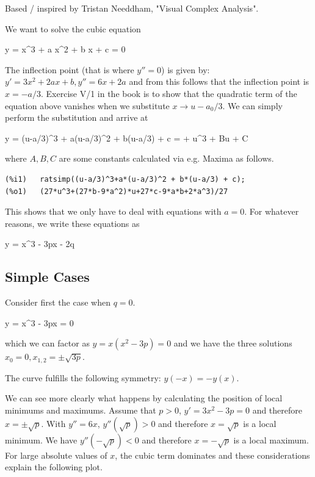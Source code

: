 

Based / inspired by Tristan Needdham, "Visual Complex Analysis".


We want to solve the cubic equation

\bee
y = x^3 + a x^2 + b x + c = 0
\eee

The inflection point (that is where $y'' = 0$) is given by: $y' = 3x^2 + 2ax + b, y'' = 6x + 2a$ and from this follows that the inflection point is $x = -a / 3$. Exercise V/1 in the book is to show that the quadratic term of the equation above vanishes when we substitute $x \rightarrow u - a_0/3$. We can simply perform the substitution and arrive at 

\bee
y = (u-a/3)^3 + a(u-a/3)^2 + b(u-a/3) + c = \cdots + u^3 + Bu + C
\eee

where $A,B,C$ are some constants calculated via e.g. Maxima as follows.

\begin{verbatim}
(%i1)	ratsimp((u-a/3)^3+a*(u-a/3)^2 + b*(u-a/3) + c);
(%o1)	(27*u^3+(27*b-9*a^2)*u+27*c-9*a*b+2*a^3)/27
\end{verbatim}

This shows that we only have to deal with equations with $a=0$. For whatever reasons, we write these equations as

\bee
y = x^3 - 3px - 2q
\eee

\subsection{Simple Cases}

Consider first the case when $q=0$.

\bee
y = x^3 - 3px = 0
\eee

which we can factor as $y = x(x^2 - 3p) = 0$ and we have the three solutions $x_0 = 0, x_{1,2} = \pm \sqrt{3p}$.

The curve fulfills the following symmetry: $y(-x) = -y(x)$.

We can see more clearly what happens by calculating the position of local minimums and maximums. Assume that $p>0$, $y' = 3x^2 - 3p = 0$ and therefore $x = \pm \sqrt{p}$. With $y'' = 6x$, $y''(\sqrt{p}) > 0$ and therefore $x = \sqrt{p}$ is a local minimum. We have $y''(-\sqrt{p}) < 0$ and therefore $x = -\sqrt{p}$ is a local maximum. For large absolute values of $x$, the cubic term dominates and these considerations explain the following plot.

